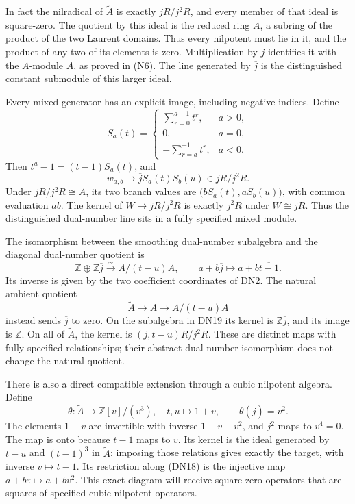 \documentclass[
]{article}
\begin{document}
In fact the nilradical of \(\widetilde A\) is exactly \(jR/j^2R\), and
every member of that ideal is square-zero. The quotient by this ideal is
the reduced ring \(A\), a subring of the product of the two Laurent
domains. Thus every nilpotent must lie in it, and the product of any two
of its elements is zero. Multiplication by \(j\) identifies it with the
\(A\)-module \(A\), as proved in (N6). The line generated by
\(\overline j\) is the distinguished constant submodule of this larger
ideal.

Every mixed generator has an explicit image, including negative indices.
Define \[
S_a(t)=\begin{cases}\sum_{r=0}^{a-1}t^r,&a>0,\\
0,&a=0,\\-\sum_{r=a}^{-1}t^r,&a<0.\end{cases}
\] Then \(t^a-1=(t-1)S_a(t)\), and \[
w_{a,b}\longmapsto\overline jS_a(t)S_b(u)\in jR/j^2R.
\tag{DN18a}
\] Under \(jR/j^2R\cong A\), its two branch values are
\(\bigl(bS_a(t),aS_b(u)\bigr)\), with common evaluation \(ab\). The
kernel of \(W\to jR/j^2R\) is exactly \(j^2R\) under \(W\cong jR\). Thus
the distinguished dual-number line sits in a fully specified mixed
module.

The isomorphism between the smoothing dual-number subalgebra and the
diagonal dual-number quotient is \[
\mathbb Z\oplus\mathbb Z\overline j\xrightarrow{\sim}A/(t-u)A,
\qquad a+b\overline j\longmapsto a+b\overline{t-1}.
\tag{DN19}
\] Its inverse is given by the two coefficient coordinates of DN2. The
natural ambient quotient \[
\widetilde A\longrightarrow A\longrightarrow A/(t-u)A
\tag{DN20}
\] instead sends \(\overline j\) to zero. On the subalgebra in DN19 its
kernel is \(\mathbb Z\overline j\), and its image is \(\mathbb Z\). On
all of \(\widetilde A\), the kernel is \((j,t-u)R/j^2R\). These are
distinct maps with fully specified relationships; their abstract
dual-number isomorphism does not change the natural quotient.

There is also a direct compatible extension through a cubic nilpotent
algebra. Define \[
\theta:\widetilde A\longrightarrow\mathbb Z[v]/(v^3),
\quad t,u\longmapsto1+v,
\qquad\theta(\overline j)=v^2.
\tag{DN21}
\] The elements \(1+v\) are invertible with inverse \(1-v+v^2\), and
\(j^2\) maps to \(v^4=0\). The map is onto because \(t-1\) maps to
\(v\). Its kernel is the ideal generated by \(t-u\) and \((t-1)^3\) in
\(\widetilde A\): imposing those relations gives exactly the target,
with inverse \(v\mapsto t-1\). Its restriction along (DN18) is the
injective map \(a+b\varepsilon\mapsto a+bv^2\). This exact diagram will
receive square-zero operators that are squares of specified
cubic-nilpotent operators.
\end{document}
